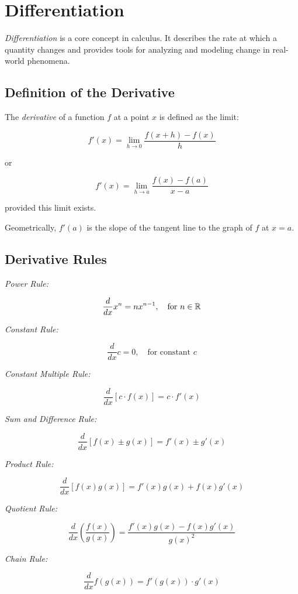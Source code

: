 \chapter{Differentiation}

\emph{Differentiation} is a core concept in calculus. It describes the rate at which a quantity changes 
and provides tools for analyzing and modeling change in real-world phenomena.

\section{Definition of the Derivative}

The \emph{derivative} of a function \(f\) at a point \(x\) is defined as the limit:

\[
    f'(x) = \lim_{h \to 0} \frac{f(x + h) - f(x)}{h}
\]

or

\[
    f'(x) = \lim_{h \to a}\frac{f(x) - f(a)}{x - a}
\]

provided this limit exists.

Geometrically, \(f'(a)\) is the slope of the tangent line to the graph of \(f\) at \(x = a\).

\section{Derivative Rules}

\emph{Power Rule:}

\[
    \frac{d}{dx} x^n = nx^{n - 1}, \quad \text{for } n \in \mathbb{R}
\]

\emph{Constant Rule:}

\[
    \frac{d}{dx} c = 0, \quad \text{for constant } c
\]

\emph{Constant Multiple Rule:}

\[
    \frac{d}{dx} [c \cdot f(x)] = c \cdot f'(x)
\]

\emph{Sum and Difference Rule:}

\[
    \frac{d}{dx} [f(x) \pm g(x)] = f'(x) \pm g'(x)
\]

\emph{Product Rule:}

\[
    \frac{d}{dx} [f(x)g(x)] = f'(x)g(x) + f(x)g'(x)
\]

\emph{Quotient Rule:}

\[
    \frac{d}{dx} \left( \frac{f(x)}{g(x)} \right) = \frac{f'(x)g(x) - f(x)g'(x)}{{g(x)}^2}
\]

\emph{Chain Rule:}

\[
    \frac{d}{dx} f(g(x)) = f'(g(x)) \cdot g'(x)
\]

